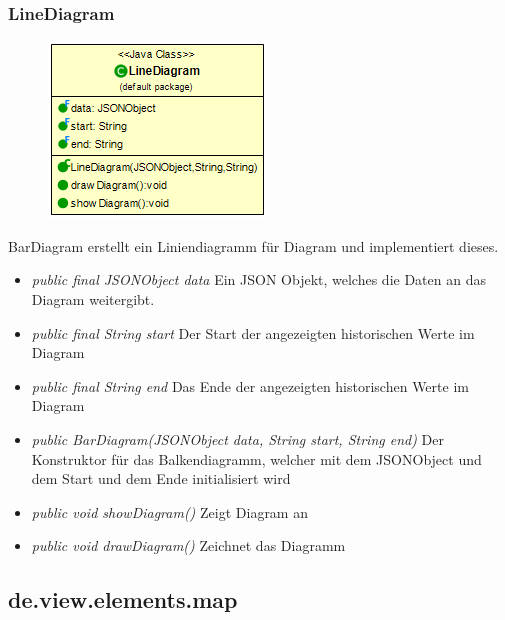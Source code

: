 \subsubsection{LineDiagram}
\begin{minipage}{0.3\textwidth}
    \begin{figure}[H]
        \includegraphics[scale = 0.5
        ]{media/view/diagram/LineDiagram_Class.png}
    \end{figure}
    \end{minipage} \hfill
    \begin{minipage}{0.6\textwidth}
BarDiagram erstellt ein Liniendiagramm für Diagram und implementiert dieses.
\end{minipage}
\begin{itemize} [noitemsep]
    \item \emph{public final JSONObject data} Ein JSON Objekt, welches die Daten an das Diagram weitergibt.
    \item \emph{public final String start} Der Start der angezeigten historischen Werte im Diagram
    \item \emph{public final String end} Das Ende der angezeigten historischen Werte im Diagram
    \item \emph{public BarDiagram(JSONObject data, String start, String end)} Der Konstruktor für das Balkendiagramm, welcher mit dem JSONObject und dem Start und dem Ende initialisiert wird
    \item \emph{public void showDiagram()} Zeigt Diagram an
    \item \emph{public void drawDiagram()} Zeichnet das Diagramm
\end{itemize}

\subsection{de.view.elements.map}

